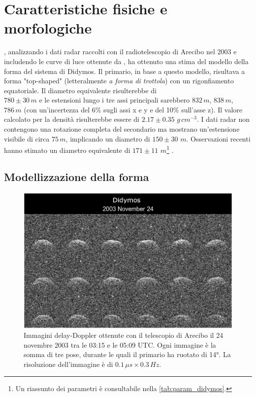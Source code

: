\section{Caratteristiche fisiche e morfologiche}
\citet{naidu_radar_2020}, analizzando i dati radar raccolti con il radiotelescopio di Arecibo nel 2003 e includendo le curve di luce ottenute da \citet{pravec_photometric_2006}, ha ottenuto una stima del modello della forma del sistema di Didymos. Il primario, in base a questo modello, risultava a forma "top-shaped" (letteralmente \textit{a forma di trottola}) con un rigonfiamento equatoriale. Il diametro equivalente risulterebbe di\\$780\pm 30\,m$ e le estensioni lungo i tre assi principali sarebbero $832\,m$, $838\,m$, $786\,m$ (con un'incertezza del 6\% sugli assi x e y e del 10\% sull'asse z). Il valore calcolato per la densità risulterebbe essere di $2.17\pm 0.35\,\, g\,cm^{-3}$. I dati radar non contengono una rotazione completa del secondario ma mostrano un'estensione visibile di circa $75\,m$, implicando un diametro di $150\pm 30\,\, m$. Osservazioni recenti hanno stimato un diametro equivalente di $171\pm 11\,\, m$\footnote{Un riassunto dei parametri è consultabile nella \cref{tab:param_didymos}.} \citep{scheirich_preimpact_2022}.


\subsection{Modellizzazione della forma}\label{sec:shape_model}

\begin{figure}[!h]
    \centering
    \includegraphics[scale=1.3]{figure/didymos_241103.jpg}
    \caption[Immagini delay-Doppler ottenute con il telescopio di Arecibo.]{Immagini delay-Doppler ottenute con il telescopio di Arecibo il 24 novembre 2003 tra le 03:15 e le 05:09 UTC. Ogni immagine è la somma di tre pose, durante le quali il primario ha ruotato di 14°. La risoluzione dell'immagine è di $0.1\,\mu s\times 0.3\,Hz$. \citep{naidu_radar_2020}}
    \label{fig:didymos_241103}
\end{figure}

